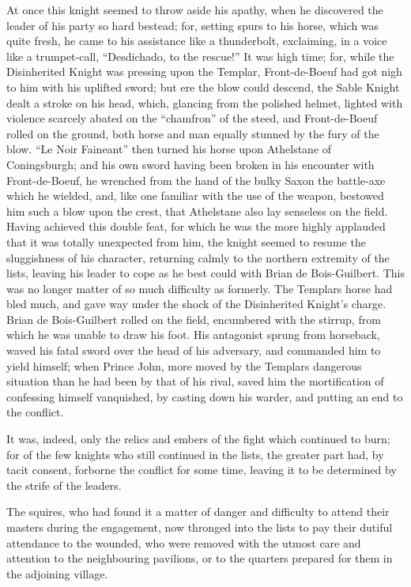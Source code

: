 At once this knight seemed to throw aside his apathy, when he discovered
the leader of his party so hard bestead; for, setting spurs to his
horse, which was quite fresh, he came to his assistance like a
thunderbolt, exclaiming, in a voice like a trumpet-call, ``Desdichado,
to the rescue!'' It was high time; for, while the Disinherited Knight
was pressing upon the Templar, Front-de-Boeuf had got nigh to him with
his uplifted sword; but ere the blow could descend, the Sable Knight
dealt a stroke on his head, which, glancing from the polished helmet,
lighted with violence scarcely abated on the ``chamfron'' of the steed,
and Front-de-Boeuf rolled on the ground, both horse and man equally
stunned by the fury of the blow. ``Le Noir Faineant'' then turned his
horse upon Athelstane of Coningsburgh; and his own sword having been
broken in his encounter with Front-de-Boeuf, he wrenched from the hand
of the bulky Saxon the battle-axe which he wielded, and, like one
familiar with the use of the weapon, bestowed him such a blow upon the
crest, that Athelstane also lay senseless on the field. Having achieved
this double feat, for which he was the more highly applauded that it was
totally unexpected from him, the knight seemed to resume the
sluggishness of his character, returning calmly to the northern
extremity of the lists, leaving his leader to cope as he best could with
Brian de Bois-Guilbert. This was no longer matter of so much difficulty
as formerly. The Templars horse had bled much, and gave way under the
shock of the Disinherited Knight's charge. Brian de Bois-Guilbert rolled
on the field, encumbered with the stirrup, from which he was unable to
draw his foot. His antagonist sprung from horseback, waved his fatal
sword over the head of his adversary, and commanded him to yield
himself; when Prince John, more moved by the Templars dangerous
situation than he had been by that of his rival, saved him the
mortification of confessing himself vanquished, by casting down his
warder, and putting an end to the conflict.

It was, indeed, only the relics and embers of the fight which continued
to burn; for of the few knights who still continued in the lists, the
greater part had, by tacit consent, forborne the conflict for some time,
leaving it to be determined by the strife of the leaders.

The squires, who had found it a matter of danger and difficulty to
attend their masters during the engagement, now thronged into the lists
to pay their dutiful attendance to the wounded, who were removed with
the utmost care and attention to the neighbouring pavilions, or to the
quarters prepared for them in the adjoining village.

